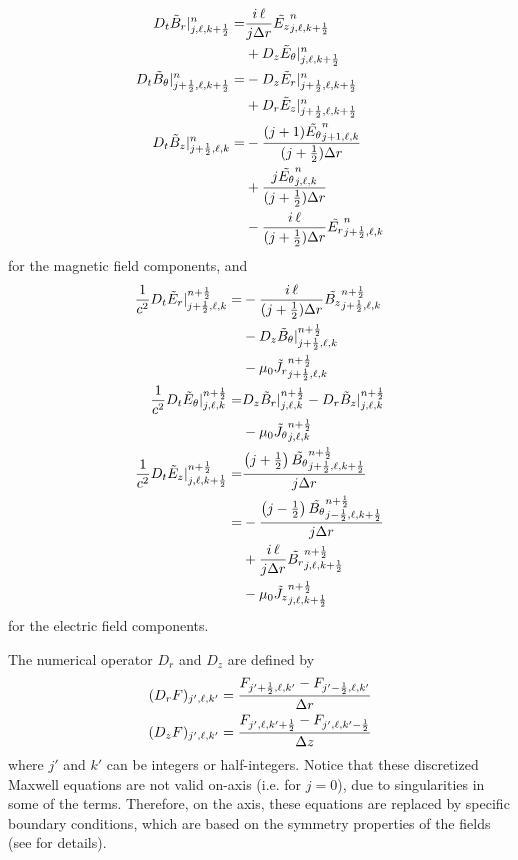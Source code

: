\documentclass[]{report}
\begin{document}
\begin{subequations}
\begin{align}
%
D_{t}\tilde{B}_r|_{j,\ell,k+\hf}^{n} \nonumber
=& \frac{i\,\ell}{j\Delta r}\tEz{n}{j,\ell,k+\hf} \\
& + D_z \tilde{E}_{\theta}|^n_{j,\ell,k+\hf} \\
%
D_{t}\tilde{B}_\theta|_{j+\hf,\ell,k+\hf}^{n} \nonumber
=& -D_z \tilde{E}_r|^n_{j+\hf,\ell,k+\hf} \\
& + D_r \tilde{E}_z|^{n}_{j+\hf,\ell,k+\hf} \\
%
D_{t}\tilde{B}_z|_{j+\hf,\ell,k}^{n} =& \nonumber
 -\frac{(j+1)\tEt{n}{j+1,\ell,k} }{(j+\hf)\Delta r} \\ \nonumber
 & +\frac{ j\tEt{n}{j,\ell,k}}{(j+\hf)\Delta r} \\
 & - \frac{i\,\ell}{(j+\hf) \Delta r}\tEr{n}{j+\hf,\ell,k}
\end{align}
\end{subequations}
for the magnetic field components, and
\begin{subequations}
\begin{align}
%
\frac{1}{c^2}D_{t}\tilde{E}_r|_{j+\hf,\ell,k}^{n+\hf} \nonumber
=& -\frac{i\,\ell}{(j+\hf)\Delta r}\tBz{n+\hf}{j+\hf,\ell,k} \\
& - D_z \tilde{B}_{\theta}|^{n+\hf}_{j+\hf,\ell,k} \nonumber\\
& - \mu_0\tJr{n+\hf}{j+\hf,\ell,k} \\
%
\frac{1}{c^2}D_{t}\tilde{E}_\theta|_{j,\ell,k}^{n+\hf} \nonumber
=& D_z \tilde{B}_r|^{n+\hf}_{j,\ell,k} - D_r \tilde{B}_z|^{n+\hf}_{j,\ell,k} \\
& - \mu_0\tJt{n+\hf}{j,\ell,k} \\
%
\frac{1}{c^2}D_{t}\tilde{E}_z|_{j,\ell,k+\hf}^{n+\hf} \nonumber
=&   \frac{\left(j+\hf\right)\tBt{n+\hf}{j+\hf,\ell,k+\hf} }{j\Delta r} \\
=&   -\frac{\left(j-\hf\right)\tBt{n+\hf}{j-\hf,\ell,k+\hf}}{j\Delta r} \nonumber\\
& + \frac{i\,\ell}{j\Delta r}\tBr{n+\hf}{j,\ell,k+\hf} \nonumber\\
& - \mu_0\tJz{n+\hf}{j,\ell,k+\hf}
\end{align}
\end{subequations}
for the electric field components.

The numerical operator $D_r$ and $D_z$ are defined by
\begin{align*}
(D_r F)_{j',\ell,k'} = \frac{F_{j'+\frac{1}{2},\ell,k'}-F_{j'-\frac{1}{2},\ell,k'} }{\Delta r} \\
(D_z F)_{j',\ell,k'} = \frac{F_{j',\ell,k'+\frac{1}{2}}-F_{j',\ell,k'-\frac{1}{2}} }{\Delta z} \\
\end{align*}
where $j'$ and $k'$ can be integers or half-integers. Notice
that these discretized Maxwell equations are not valid on-axis (i.e. for $j=0$), due to
singularities in some of the terms. Therefore, on the axis, these equations are replaced by specific boundary conditions, which are based on the symmetry properties of the fields (see \cite{LifschitzJCP2009} for details).
\end{document}
